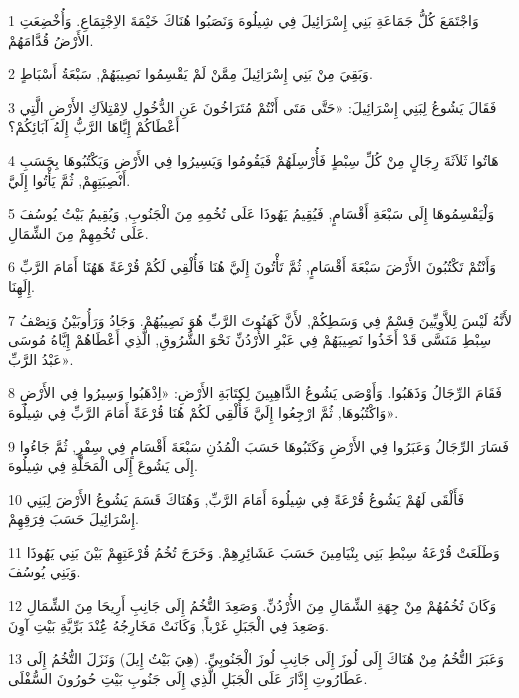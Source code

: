 \par 1 وَاجْتَمَعَ كُلُّ جَمَاعَةِ بَنِي إِسْرَائِيلَ فِي شِيلُوهَ وَنَصَبُوا هُنَاكَ خَيْمَةَ الاِجْتِمَاعِ. وَأُخْضِعَتِ الأَرْضُ قُدَّامَهُمْ.
\par 2 وَبَقِيَ مِنْ بَنِي إِسْرَائِيلَ مِمَّنْ لَمْ يَقْسِمُوا نَصِيبَهُمْ, سَبْعَةُ أَسْبَاطٍ.
\par 3 فَقَالَ يَشُوعُ لِبَنِي إِسْرَائِيلَ: «حَتَّى مَتَى أَنْتُمْ مُتَرَاخُونَ عَنِ الدُّخُولِ لاِمْتِلاَكِ الأَرْضِ الَّتِي أَعْطَاكُمْ إِيَّاهَا الرَّبُّ إِلَهُ آبَائِكُمْ؟
\par 4 هَاتُوا ثَلاَثَةَ رِجَالٍ مِنْ كُلِّ سِبْطٍ فَأُرْسِلَهُمْ فَيَقُومُوا وَيَسِيرُوا فِي الأَرْضِ وَيَكْتُبُوهَا بِحَسَبِ أَنْصِبَتِهِمْ, ثُمَّ يَأْتُوا إِلَيَّ.
\par 5 وَلْيَقْسِمُوهَا إِلَى سَبْعَةِ أَقْسَامٍ, فَيُقِيمُ يَهُوذَا عَلَى تُخُمِهِ مِنَ الْجَنُوبِ, وَيُقِيمُ بَيْتُ يُوسُفَ عَلَى تُخُمِهِمْ مِنَ الشِّمَالِ.
\par 6 وَأَنْتُمْ تَكْتُبُونَ الأَرْضَ سَبْعَةَ أَقْسَامٍ, ثُمَّ تَأْتُونَ إِلَيَّ هُنَا فَأُلْقِي لَكُمْ قُرْعَةً هَهُنَا أَمَامَ الرَّبِّ إِلَهِنَا.
\par 7 لأَنَّهُ لَيْسَ لِلاَّوِيِّينَ قِسْمٌ فِي وَسَطِكُمْ, لأَنَّ كَهَنُوتَ الرَّبِّ هُوَ نَصِيبُهُمْ. وَجَادُ وَرَأُوبَيْنُ وَنِصْفُ سِبْطِ مَنَسَّى قَدْ أَخَذُوا نَصِيبَهُمْ فِي عَبْرِ الأُرْدُنِّ نَحْوَ الشُّرُوقِ, الَّذِي أَعْطَاهُمْ إِيَّاهُ مُوسَى عَبْدُ الرَّبِّ».
\par 8 فَقَامَ الرِّجَالُ وَذَهَبُوا. وَأَوْصَى يَشُوعُ الذَّاهِبِينَ لِكِتَابَةِ الأَرْضِ: «اِذْهَبُوا وَسِيرُوا فِي الأَرْضِ وَاكْتُبُوهَا, ثُمَّ ارْجِعُوا إِلَيَّ فَأُلْقِي لَكُمْ هُنَا قُرْعَةً أَمَامَ الرَّبِّ فِي شِيلُوهَ».
\par 9 فَسَارَ الرِّجَالُ وَعَبَرُوا فِي الأَرْضِ وَكَتَبُوهَا حَسَبَ الْمُدُنِ سَبْعَةَ أَقْسَامٍ فِي سِفْرٍ, ثُمَّ جَاءُوا إِلَى يَشُوعَ إِلَى الْمَحَلَّةِ فِي شِيلُوهَ.
\par 10 فَأَلْقَى لَهُمْ يَشُوعُ قُرْعَةً فِي شِيلُوهَ أَمَامَ الرَّبِّ, وَهُنَاكَ قَسَمَ يَشُوعُ الأَرْضَ لِبَنِي إِسْرَائِيلَ حَسَبَ فِرَقِهِمْ.
\par 11 وَطَلَعَتْ قُرْعَةُ سِبْطِ بَنِي بِنْيَامِينَ حَسَبَ عَشَائِرِهِمْ. وَخَرَجَ تُخُمُ قُرْعَتِهِمْ بَيْنَ بَنِي يَهُوذَا وَبَنِي يُوسُفَ.
\par 12 وَكَانَ تُخُمُهُمْ مِنْ جِهَةِ الشِّمَالِ مِنَ الأُرْدُنِّ. وَصَعِدَ التُّخُمُ إِلَى جَانِبِ أَرِيحَا مِنَ الشِّمَالِ وَصَعِدَ فِي الْجَبَلِ غَرْباً, وَكَانَتْ مَخَارِجُهُ عَُِنْدَ بَرِّيَّةِ بَيْتِ آوِنَ.
\par 13 وَعَبَرَ التُّخُمُ مِنْ هُنَاكَ إِلَى لُوزَ إِلَى جَانِبِ لُوزَ الْجَنُوبِيِّ. (هِيَ بَيْتُ إِيلَ) وَنَزَلَ التُّخُمُ إِلَى عَطَارُوتِ إِدَّارَ عَلَى الْجَبَلِ الَّذِي إِلَى جَنُوبِ بَيْتِ حُورُونَ السُّفْلَى.
